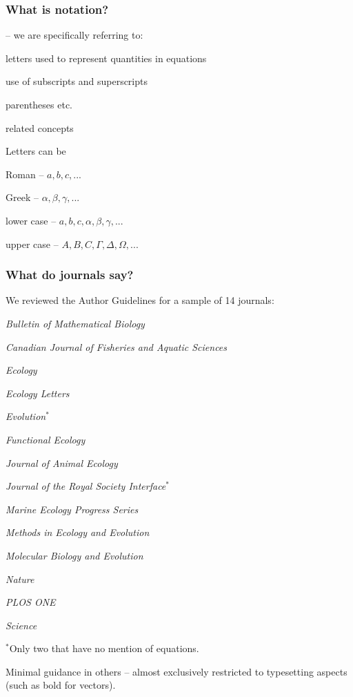 
\begin{frame}
\frametitle{What is notation?}

 -- we are specifically referring to:
\bi
\item letters used to represent quantities in equations
\item use of subscripts and superscripts
\item parentheses etc.
\item related concepts
\ei

Letters can be
\bi
\item Roman -- $a, b, c, ...$
\item Greek -- $\alpha, \beta, \gamma, ...$
\item lower case -- $a, b, c, \alpha, \beta, \gamma, ...$
\item upper case -- $A, B, C, \Gamma, \Delta, \Omega, ...$
\ei

\end{frame}


\begin{frame}
\frametitle{What do journals say?}
We reviewed the Author Guidelines for a sample of 14 journals:
\begin{multicols}{2}
\bi
\item \emph{Bulletin of Mathematical Biology}
\item \emph{Canadian Journal of Fisheries and Aquatic Sciences}
\item \emph{Ecology}
\item \emph{Ecology Letters}
\item \emph{Evolution$^*$}
\item \emph{Functional Ecology}
\item \emph{Journal of Animal Ecology}
\item \emph{Journal of the Royal Society Interface$^*$}
\item \emph{Marine Ecology Progress Series}
\item \emph{Methods in Ecology and Evolution}
\item \emph{Molecular Biology and Evolution}
\item \emph{Nature}
\item \emph{PLOS ONE}
\item \emph{Science}
\item[\vspace{\fill}]
\ei
\end{multicols}

$^*$Only two that have no mention of equations.

Minimal guidance in others -- almost exclusively restricted to typesetting aspects
(such as bold for vectors).

\end{frame}

